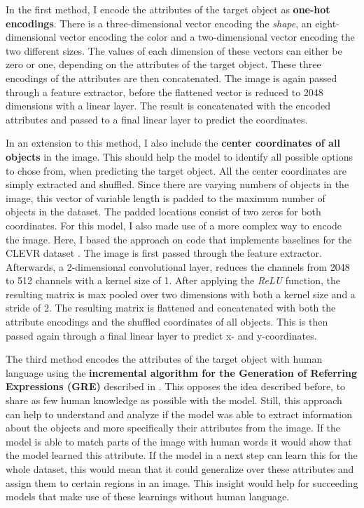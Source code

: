 In the first method, I encode the attributes of the target object as \textbf{one-hot encodings}.
There is a three-dimensional vector encoding the \emph{shape}, an eight-dimensional vector encoding the color and a two-dimensional vector encoding the two different sizes.
The values of each dimension of these vectors can either be zero or one, depending on the attributes of the target object.
These three encodings of the attributes are then concatenated.
The image is again passed through a feature extractor, before the flattened vector is reduced to 2048 dimensions with a linear layer.
The result is concatenated with the encoded attributes and passed to a final linear layer to predict the coordinates.

In an extension to this method, I also include the \textbf{center coordinates of all objects} in the image.
This should help the model to identify all possible options to chose from, when predicting the target object.
All the center coordinates are simply extracted and shuffled.
Since there are varying numbers of objects in the image, this vector of variable length is padded to the maximum number of objects in the dataset.
The padded locations consist of two zeros for both coordinates.
For this model, I also made use of a more complex way to encode the image.
Here, I based the approach on code that implements baselines for the CLEVR dataset \citep{Johnson2017}.
The image is first passed through the feature extractor.
Afterwards, a 2-dimensional convolutional layer, reduces the channels from 2048 to 512 channels with a kernel size of 1.
After applying the \emph{ReLU} function, the resulting matrix is max pooled over two dimensions with both a kernel size and a stride of 2.
The resulting matrix is flattened and concatenated with both the attribute encodings and the shuffled coordinates of all objects.
This is then passed again through a final linear layer to predict x- and y-coordinates.

The third method encodes the attributes of the target object with human language using the \textbf{incremental algorithm for the Generation of Referring Expressions (GRE)} described in \citet{Dale1995}.
This opposes the idea described before, to share as few human knowledge as possible with the model.
Still, this approach can help to understand and analyze if the model was able to extract information about the objects and more specifically their attributes from the image.
If the model is able to match parts of the image with human words it would show that the model learned this attribute.
If the model in a next step can learn this for the whole dataset, this would mean that it could generalize over these attributes and assign them to certain regions in an image.
This insight would help for succeeding models that make use of these learnings without human language.

